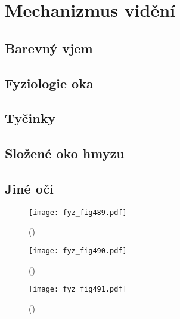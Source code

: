 \chapter{Mechanizmus vidění}\label{fyz:IchapXXXVI}
\minitoc
  \section{Barevný vjem}\label{fyz:IchapXXXVIsecI}
  \section{Fyziologie oka}\label{fyz:IchapXXXVIsecII}
  \section{Tyčinky}\label{fyz:IchapXXXVIsecIII}
  \section{Složené oko hmyzu}\label{fyz:IchapXXXVIsecIV}
  \section{Jiné oči}\label{fyz:IchapXXXVIsecV}

  \begin{figure}[ht!] %
    \centering
    \texttt{[image: fyz\_fig489.pdf]}
    \caption{
             (\cite[s.~697]{Feynman01})}
    \label{fyz:fig489}
  \end{figure}

  \begin{figure}[ht!] %
    \centering
    \texttt{[image: fyz\_fig490.pdf]}
    \caption{
             (\cite[s.~697]{Feynman01})}
    \label{fyz:fig490}
  \end{figure}

  \begin{figure}[ht!] %
    \centering
    \texttt{[image: fyz\_fig491.pdf]}
    \caption{
             (\cite[s.~697]{Feynman01})}
    \label{fyz:fig491}
  \end{figure}

